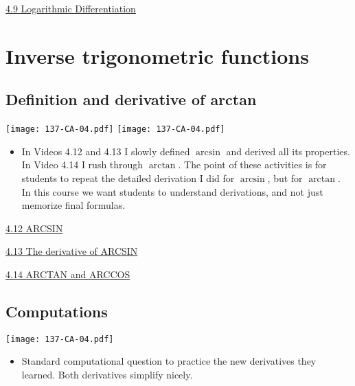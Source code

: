 \documentclass[11pt]{article}
\newcommand{\nl}{\hfill \vspace{-1.1\baselineskip}} %
\newcommand{\vix}{\hspace{8mm} \href{https://www.youtube.com/watch?v=0iF8AUWVrb0&list=PLlwePzQY_wW-EDeUZebRoA8HGoeZxxpEU&index=9}{4.9 Logarithmic Differentiation}}
\newcommand{\vxii}{\hspace{8mm} \href{https://www.youtube.com/watch?v=V7cK2SQMizE&list=PLlwePzQY_wW-EDeUZebRoA8HGoeZxxpEU&index=12}{4.12 ARCSIN}}
\newcommand{\vxiii}{\hspace{8mm} \href{https://www.youtube.com/watch?v=kuKrSTOKw30&list=PLlwePzQY_wW-EDeUZebRoA8HGoeZxxpEU&index=13}{4.13 The derivative of ARCSIN}}
\newcommand{\vxiv}{\hspace{8mm} \href{https://www.youtube.com/watch?v=kANSILD9sn0&list=PLlwePzQY_wW-EDeUZebRoA8HGoeZxxpEU&index=14}{4.14 ARCTAN and ARCCOS}}
\begin{document}
\begin{videos}
\vix
\end{videos}

\newpage
\section{Inverse trigonometric functions}

\subsection{Definition and derivative of arctan} 

\begin{center}
{ \texttt{[image: 137-CA-04.pdf]}}  \quad
{ \texttt{[image: 137-CA-04.pdf]}} 
\end{center}


\begin{comments}
\nl
\begin{itemize}
	\item In Videos 4.12 and 4.13 I slowly defined $\arcsin$ and derived all its properties.  In Video 4.14 I rush through $\arctan$.  The point of these activities is for students to repeat the detailed derivation I did for $\arcsin$, but for $\arctan$.    In this course we want students to understand derivations, and not just memorize final formulas.
\end{itemize}	
\end{comments}

\begin{videos}
\vxii

\vxiii

\vxiv
\end{videos}

\newpage
\subsection{Computations} 

\begin{center}
{ \texttt{[image: 137-CA-04.pdf]}} 
\end{center}


\begin{comments}
\nl
\begin{itemize}
	\item Standard computational question to practice the new derivatives they learned.  Both derivatives simplify nicely.
\end{itemize}	
\end{comments}
\end{document}
